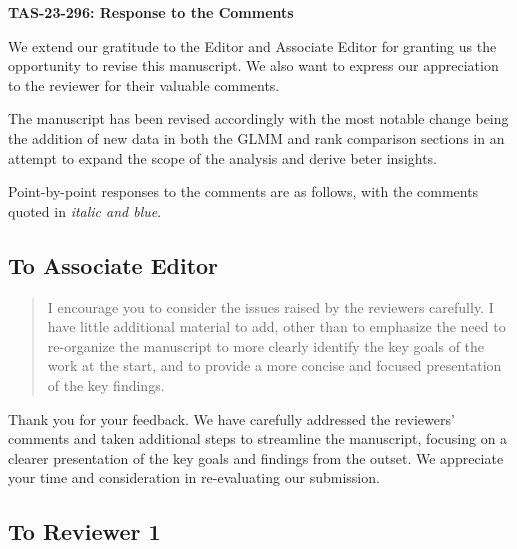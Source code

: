 \documentclass[12pt]{article}
\newenvironment{comment}%
{\begin{quotation}\noindent\small\it\color{darkblue}\ignorespaces%
}{\end{quotation}}
\begin{document}
\begin{center}
  {\Large\bf TAS-23-296: Response to the Comments}
\end{center}

We extend our gratitude to the Editor and Associate Editor for 
granting us the opportunity to revise this manuscript. We also want to
express our appreciation to the reviewer for their valuable comments. 


The manuscript has been revised accordingly with the most notable change being 
the addition of new data in both the GLMM and rank comparison sections in an
attempt to expand the scope of the analysis and derive beter insights. 


Point-by-point responses to the comments are as follows, with the
comments quoted in \emph{\color{darkblue} italic and blue}.



\subsection*{To Associate Editor}

\begin{comment}
I encourage you to consider the issues raised by the reviewers carefully. I have
little additional material to add, other than to emphasize the need to
re-organize the manuscript to more clearly identify the key goals of the work at
the start, and to provide a more concise and focused presentation of the key
findings.
\end{comment}

Thank you for your feedback. We have carefully addressed the
reviewers' comments and taken additional steps to streamline the
manuscript, focusing on a clearer presentation of the key goals and
findings from the outset. We appreciate your time and consideration in
re-evaluating our submission.


\subsection*{To Reviewer 1}
\end{document}
